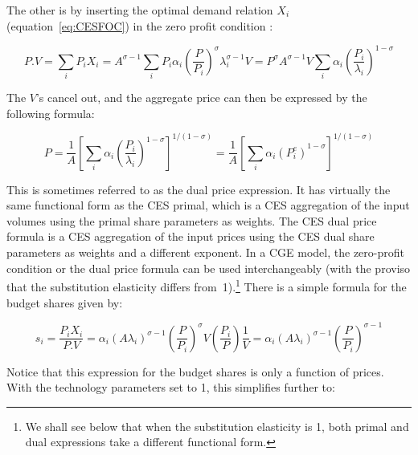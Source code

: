 The other is by inserting the optimal demand relation $X_i$ (equation~\ref{eq:CESFOC})
in the zero profit condition :

\begin{displaymath}
P.V=\sum\limits_{i}{{{P}_{i}}{{X}_{i}}}={{A}^{\sigma -1}}{{\sum\limits_{i}{{{P}_{i}}
{{\alpha }_{i}}\left( \frac{P}{{{P}_{i}}} \right)}}^{\sigma }}\lambda _{i}^{\sigma -1}V={{P}^{\sigma }}{{A}^{\sigma -1}}V{{\sum\limits_{i}{{{\alpha }_{i}}\left( \frac{{{P}_{i}}}{{{\lambda }_{i}}} \right)}}^{1-\sigma }}
\end{displaymath}

The $V$'s cancel out, and the aggregate price can then be expressed by the following formula:

\begin{equation} \label{eq:CESDual}
P=\frac{1}{A}{{\left[ {{\sum\limits_{i}{{{\alpha }_{i}}\left( \frac{{{P}_{i}}}{{{\lambda }_{i}}}
\right)}}^{1-\sigma }} \right]}^{1/(1-\sigma )}}
= \frac{1}{A}{{\left[ {{\sum\limits_{i}{{{\alpha }_{i}}\left( P_{i}^{e} \right)}}^{1-\sigma }}
\right]}^{1/(1-\sigma )}}
\end{equation}

This is sometimes referred to as the dual price expression. It has virtually the same functional
form as the CES primal, which is a CES aggregation of the input volumes using the primal share
parameters as weights. The CES dual price formula is a CES aggregation of the input prices using
the CES dual share parameters as weights and a different exponent. In a CGE model, the zero-profit
condition or the dual price formula can be used interchangeably (with the proviso that the
substitution elasticity differs from~1).\footnote{We shall see below that when the substitution
elasticity is 1, both primal and dual expressions take a different functional form.}
There is a simple formula for the budget shares given by:

\begin{equation} \label{eq:CESShare}
{{s}_{i}}=\frac{{{P}_{i}}{{X}_{i}}}{P.V}={{\alpha }_{i}}
{{\left(A{\lambda _{i}} \right)}^{\sigma -1}}
{{\left( \frac{P}{{{P}_{i}}} \right)}^{\sigma }}V\left( \frac{{{P}_{i}}}{P}
\right)\frac{1}{V}={{\alpha }_{i}}{{\left(A{\lambda _{i}} \right)}^{\sigma -1}}
{{\left( \frac{P}{{{P}_{i}}} \right)}^{\sigma -1}}
\end{equation}

Notice that this expression for the budget shares is only a function of prices. With the technology
parameters set to 1, this simplifies further to:

